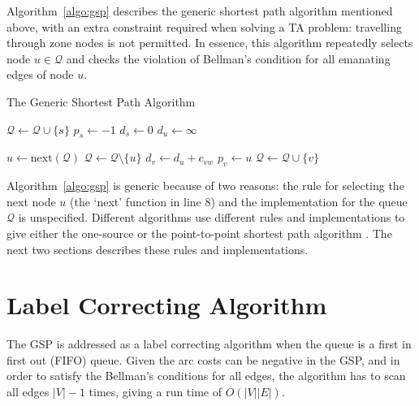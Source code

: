 Algorithm~\ref{algo:gsp} \citep{Klunder} describes the generic shortest path algorithm mentioned above,
with an extra constraint required when solving a TA problem: travelling through zone nodes is not permitted.
In essence, this algorithm repeatedly selects node $u\in\mathcal{Q}$ and checks the violation of Bellman's condition for all emanating edges of node $u$.
\begin{algorithm}
    \caption{The Generic Shortest Path Algorithm}
    \label{algo:gsp}
    \begin{algorithmic}[1]
        \State $\mathcal{Q} \gets \mathcal{Q} \cup \{s\}$ 
        \State $p_s \gets -1$ 
        \State $d_s \gets 0$
         
        \State $d_u \gets \infty$
    \EndFor

    \State $ u \gets \text{next}(\mathcal{Q}) $ 
    \State $ \mathcal{Q} \gets \mathcal{Q} \setminus \{u\} $
     
    \State $d_v \gets d_u + c_{vw}$
    \State $p_v \gets u$
    \State $\mathcal{Q} \gets \mathcal{Q} \cup \{v\}$ 
\EndIf
                    \EndIf
                \EndFor
            \EndIf
        \EndWhile
    \EndProcedure
\end{algorithmic}
\end{algorithm}

Algorithm~\ref{algo:gsp} is generic because of two reasons:
the rule for selecting the next node $u$ (the `next' function in line 8) and
the implementation for the queue $\mathcal{Q}$ is unspecified.
Different algorithms use different rules and implementations to give 
either the one-source or the point-to-point shortest path algorithm \citep{mplomer}.
The next two sections describes these rules and implementations.

\section{Label Correcting Algorithm}
\label{section:labelcorrectingalgorithm}
The GSP is addressed as a label correcting algorithm when the queue is a first in first out (FIFO) queue.
Given the arc costs can be negative in the GSP,
and in order to satisfy the Bellman's conditions for all edges,
the algorithm has to scan all edges $|V|-1$ times,
giving a run time of $O(|V||E|)$.

